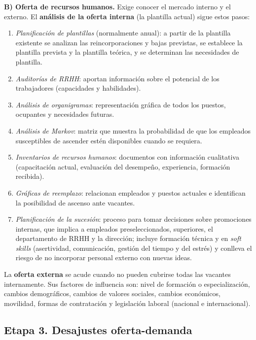 \documentclass[12pt]{book} %
\providecommand{\tightlist}{%
  \setlength{\itemsep}{0pt}\setlength{\parskip}{0pt}}
\begin{document}
\textbf{B) Oferta de recursos humanos.} Exige conocer el mercado interno
y el externo. El \textbf{análisis de la oferta interna} (la plantilla
actual) sigue estos pasos:

\begin{enumerate}
\def\labelenumi{\arabic{enumi}.}
\tightlist
\item
  \emph{Planificación de plantillas} (normalmente anual): a partir de la
  plantilla existente se analizan las reincorporaciones y bajas
  previstas, se establece la plantilla prevista y la plantilla teórica,
  y se determinan las necesidades de plantilla.
\item
  \emph{Auditorías de RRHH}: aportan información sobre el potencial de
  los trabajadores (capacidades y habilidades).
\item
  \emph{Análisis de organigramas}: representación gráfica de todos los
  puestos, ocupantes y necesidades futuras.
\item
  \emph{Análisis de Markov}: matriz que muestra la probabilidad de que
  los empleados susceptibles de ascender estén disponibles cuando se
  requiera.
\item
  \emph{Inventarios de recursos humanos}: documentos con información
  cualitativa (capacitación actual, evaluación del desempeño,
  experiencia, formación recibida).
\item
  \emph{Gráficas de reemplazo}: relacionan empleados y puestos actuales
  e identifican la posibilidad de ascenso ante vacantes.
\item
  \emph{Planificación de la sucesión}: proceso para tomar decisiones
  sobre promociones internas, que implica a empleados preseleccionados,
  superiores, el departamento de RRHH y la dirección; incluye formación
  técnica y en \emph{soft skills} (asertividad, comunicación, gestión
  del tiempo y del estrés) y conlleva el riesgo de no incorporar
  personal externo con nuevas ideas.
\end{enumerate}

La \textbf{oferta externa} se acude cuando no pueden cubrirse todas las
vacantes internamente. Sus factores de influencia son: nivel de
formación o especialización, cambios demográficos, cambios de valores
sociales, cambios económicos, movilidad, formas de contratación y
legislación laboral (nacional e internacional).

\hypertarget{etapa-3.-desajustes-oferta-demanda}{%
\subsection{Etapa 3. Desajustes
oferta-demanda}\label{etapa-3.-desajustes-oferta-demanda}}
\end{document}
